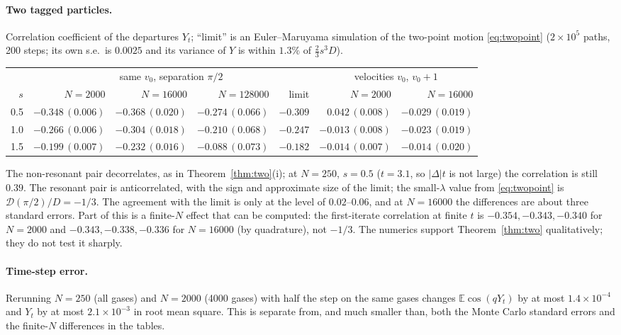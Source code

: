 \documentclass[11pt]{article}
\newcommand{\E}{\mathbb{E}}
\theoremstyle{remark}
\begin{document}
\paragraph{Two tagged particles.} Correlation coefficient of the departures
$Y_t$; ``limit'' is an Euler--Maruyama simulation of the two-point motion
\eqref{eq:twopoint} ($2\times10^5$ paths, 200 steps; its own s.e.\ is
$0.0025$ and its variance of $Y$ is within $1.3\%$ of $\frac23s^3D$).
\begin{center}
\small
\begin{tabular}{rrrrrrr}
 & \multicolumn{4}{c}{same $v_0$, separation $\pi/2$} &
 \multicolumn{2}{c}{velocities $v_0$, $v_0+1$}\\
 $s$ & $N=2000$ & $N=16000$ & $N=128000$ & limit & $N=2000$ & $N=16000$\\ \hline
 0.5 & $-0.348\,(0.006)$ & $-0.368\,(0.020)$ & $-0.274\,(0.066)$ & $-0.309$ & $0.042\,(0.008)$ & $-0.029\,(0.019)$\\
 1.0 & $-0.266\,(0.006)$ & $-0.304\,(0.018)$ & $-0.210\,(0.068)$ & $-0.247$ & $-0.013\,(0.008)$ & $-0.023\,(0.019)$\\
 1.5 & $-0.199\,(0.007)$ & $-0.232\,(0.016)$ & $-0.088\,(0.073)$ & $-0.182$ & $-0.014\,(0.007)$ & $-0.014\,(0.020)$\\
\end{tabular}
\end{center}
The non-resonant pair decorrelates, as in Theorem~\ref{thm:two}(i); at
$N=250$, $s=0.5$ ($t=3.1$, so $|\Delta|t$ is not large) the correlation is
still $0.39$. The resonant pair is anticorrelated, with the sign and
approximate size of the limit; the small-$\lambda$ value from
\eqref{eq:twopoint} is $\mathcal D(\pi/2)/D=-1/3$. The agreement with the
limit is only at the level of $0.02$--$0.06$, and at $N=16000$ the
differences are about three standard errors. Part of this is a finite-$N$
effect that can be computed: the first-iterate correlation at finite $t$ is
$-0.354,-0.343,-0.340$ for $N=2000$ and $-0.343,-0.338,-0.336$ for
$N=16000$ (by quadrature), not $-1/3$. The numerics support
Theorem~\ref{thm:two} qualitatively; they do not test it sharply.

\paragraph{Time-step error.} Rerunning $N=250$ (all gases) and $N=2000$
(4000 gases) with half the step on the same gases changes
$\E\cos(qY_t)$ by at most $1.4\times10^{-4}$ and $Y_t$ by at most
$2.1\times10^{-3}$ in root mean square. This is separate from, and much
smaller than, both the Monte Carlo standard errors and the finite-$N$
differences in the tables.
\end{document}
